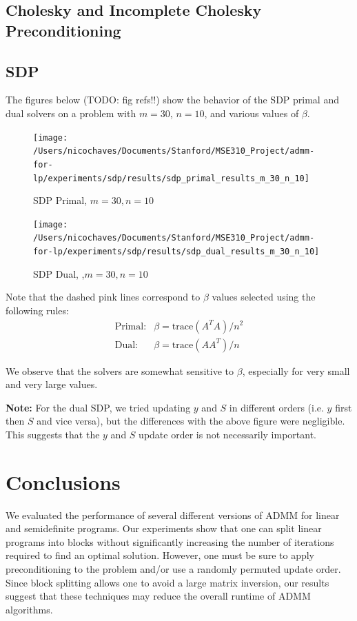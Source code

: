 \documentclass{article}
\begin{document}
\subsection*{Cholesky and Incomplete Cholesky Preconditioning}

\subsection*{SDP}


The figures below (TODO: fig refs!!) show the behavior of the SDP primal and dual solvers on a problem with $m=30$, $n=10$, and various values of $\beta$.

\begin{figure}[ht]
	\centering
	\texttt{[image: /Users/nicochaves/Documents/Stanford/MSE310\_Project/admm-for-lp/experiments/sdp/results/sdp\_primal\_results\_m\_30\_n\_10]}
	\caption{SDP Primal, $m=30, n=10$}
	\label{fig:sdp_primal}
\end{figure}

\begin{figure}[ht]
	\centering
	\texttt{[image: /Users/nicochaves/Documents/Stanford/MSE310\_Project/admm-for-lp/experiments/sdp/results/sdp\_dual\_results\_m\_30\_n\_10]}
	\caption{SDP Dual, ,$m=30, n=10$}
	\label{fig:sdp_dual}
\end{figure}

Note that the dashed pink lines correspond to $\beta$ values selected
using the following rules:
\begin{eqnarray*}
\text{Primal:} & \beta=\text{trace}(A^{T}A)/n^{2}\\
\text{Dual:} & \beta=\text{trace}(AA^{T})/n
\end{eqnarray*}

We observe that the solvers are somewhat sensitive to $\beta$, especially
for very small and very large values. 

\textbf{Note:} For the dual SDP, we tried updating $y$ and $S$ in
different orders (i.e. $y$ first then $S$ and vice versa), but the
differences with the above figure were negligible. This suggests that
the $y$ and $S$ update order is not necessarily important.


\vspace{0.1in}
\section{Conclusions}

We evaluated the performance of several different versions of ADMM for linear and semidefinite programs. Our experiments show that one can split linear programs into blocks without significantly increasing the number of iterations required to find an optimal solution. However, one must be sure to apply preconditioning to the problem and/or use a randomly permuted update order. Since block splitting allows one to avoid a large matrix inversion, our results suggest that these techniques may reduce the overall runtime of ADMM algorithms. 
\end{document}
